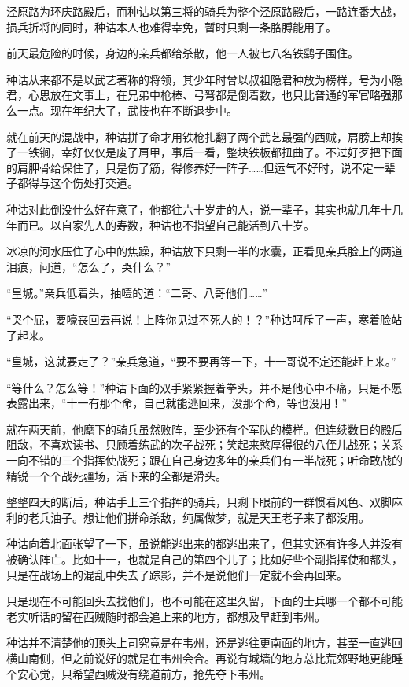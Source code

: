 泾原路为环庆路殿后，而种诂以第三将的骑兵为整个泾原路殿后，一路连番大战，损兵折将的同时，种诂本人也难得幸免，暂时只剩一条胳膊能用了。

前天最危险的时候，身边的亲兵都给杀散，他一人被七八名铁鹞子围住。

种诂从来都不是以武艺著称的将领，其少年时曾以叔祖隐君种放为榜样，号为小隐君，心思放在文事上，在兄弟中枪棒、弓弩都是倒着数，也只比普通的军官略强那么一点。现在年纪大了，武技也在不断退步中。

就在前天的混战中，种诂拼了命才用铁枪扎翻了两个武艺最强的西贼，肩膀上却挨了一铁锏，幸好仅仅是废了肩甲，事后一看，整块铁板都扭曲了。不过好歹把下面的肩胛骨给保住了，只是伤了筋，得修养好一阵子……但运气不好时，说不定一辈子都得与这个伤处打交道。

种诂对此倒没什么好在意了，他都往六十岁走的人，说一辈子，其实也就几年十几年而已。以自家先人的寿数，种诂也不指望自己能活到八十岁。

冰凉的河水压住了心中的焦躁，种诂放下只剩一半的水囊，正看见亲兵脸上的两道泪痕，问道，“怎么了，哭什么？”

“皇城。”亲兵低着头，抽噎的道：“二哥、八哥他们……”

“哭个屁，要嚎丧回去再说！上阵你见过不死人的！？”种诂呵斥了一声，寒着脸站了起来。

“皇城，这就要走了？”亲兵急道，“要不要再等一下，十一哥说不定还能赶上来。”

“等什么？怎么等！”种诂下面的双手紧紧握着拳头，并不是他心中不痛，只是不愿表露出来，“十一有那个命，自己就能逃回来，没那个命，等也没用！”

就在两天前，他麾下的骑兵虽然败阵，至少还有个军队的模样。但连续数日的殿后阻敌，不喜欢读书、只顾着练武的次子战死；笑起来憨厚得很的八侄儿战死；关系一向不错的三个指挥使战死；跟在自己身边多年的亲兵们有一半战死；听命敢战的精锐一个个战死疆场，活下来的全都是滑头。

整整四天的断后，种诂手上三个指挥的骑兵，只剩下眼前的一群惯看风色、双脚麻利的老兵油子。想让他们拼命杀敌，纯属做梦，就是天王老子来了都没用。

种诂向着北面张望了一下，虽说能逃出来的都逃出来了，但其实还有许多人并没有被确认阵亡。比如十一，也就是自己的第四个儿子；比如好些个副指挥使和都头，只是在战场上的混乱中失去了踪影，并不是说他们一定就不会再回来。

只是现在不可能回头去找他们，也不可能在这里久留，下面的士兵哪一个都不可能老实听话的留在西贼随时都会追上来的地方，都想及早赶到韦州。

种诂并不清楚他的顶头上司究竟是在韦州，还是逃往更南面的地方，甚至一直逃回横山南侧，但之前说好的就是在韦州会合。再说有城墙的地方总比荒郊野地更能睡个安心觉，只希望西贼没有绕道前方，抢先夺下韦州。

